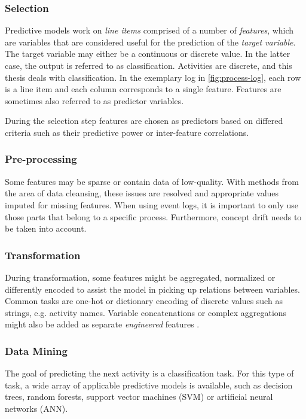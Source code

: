 \subsubsection*{Selection}
Predictive models work on \textit{line items} comprised of a number of \textit{features}, which are variables that are considered useful for the prediction of the \textit{target variable}. The target variable may either be a continuous or discrete value. In the latter case, the output is referred to as classification. Activities are discrete, and this thesis deals with classification.
In the exemplary log in \autoref{fig:process-log}, each row is a line item and each column corresponds to a single feature. Features are sometimes also referred to as predictor variables.

During the selection step features are chosen as predictors based on differed criteria such as their predictive power or inter-feature correlations.

\subsubsection*{Pre-processing}
Some features may be sparse or contain data of low-quality. With methods from the area of data cleansing, these issues are resolved and appropriate values imputed for missing features. When using event logs, it is important to only use those parts that belong to a specific process. Furthermore, concept drift needs to be taken into account.

\subsubsection*{Transformation}
\label{sec:predictive-model-development:transformation}
During transformation, some features might be aggregated, normalized or differently encoded to assist the model in picking up relations between variables. Common tasks are one-hot or dictionary encoding of discrete values such as strings, e.g. activity names. Variable concatenations or complex aggregations might also be added as separate \textit{engineered} features \cite{schoenig2018}.

\subsubsection*{Data Mining}
The goal of predicting the next activity is a classification task. For this type of task, a wide array of applicable predictive models is available, such as decision trees, random forests, support vector machines (SVM) or artificial neural networks (ANN).

